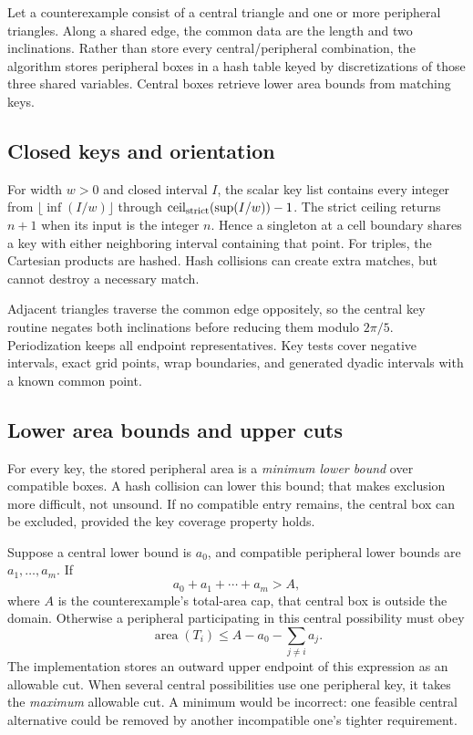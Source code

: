 \documentclass[11pt,a4paper]{article}
\newcommand{\code}[1]{\texttt{\detokenize{#1}}}
\newcommand{\area}{\operatorname{area}}\newcommand{\arc}{\operatorname{arc}}
\theoremstyle{remark}\newtheorem*{contract}{Implementation contract}\newtheorem*{auditnote}{Audit note}
\begin{document}
Let a counterexample consist of a central triangle and one or more peripheral
triangles. Along a shared edge, the common data are the length and two
inclinations. Rather than store every central/peripheral combination, the
algorithm stores peripheral boxes in a hash table keyed by discretizations
of those three shared variables. Central boxes retrieve lower area bounds
from matching keys.

\subsection{Closed keys and orientation}
For width $w>0$ and closed interval $I$, the scalar key list contains every
integer from $\lfloor\inf(I/w)\rfloor$ through
$\operatorname{ceil}_{\rm strict}(\sup(I/w))-1$. The strict ceiling
returns $n+1$ when its input is the integer $n$. Hence a singleton at a cell
boundary shares a key with either neighboring interval containing that point.
For triples, the Cartesian products are hashed. Hash collisions can create
extra matches, but cannot destroy a necessary match.



Adjacent triangles traverse the common edge oppositely, so the central
key routine negates both inclinations before reducing them modulo $2\pi/5$.
Periodization keeps all endpoint representatives. Key tests cover negative
intervals, exact grid points, wrap boundaries, and generated dyadic intervals
with a known common point.

\subsection{Lower area bounds and upper cuts}
For every key, the stored peripheral area is a \emph{minimum lower bound}
over compatible boxes. A hash collision can lower this bound; that makes
exclusion more difficult, not unsound. If no compatible entry remains, the
central box can be excluded, provided the key coverage property holds.

Suppose a central lower bound is $a_0$, and compatible peripheral lower
bounds are $a_1,\ldots,a_m$. If
\[
a_0+a_1+\cdots+a_m>A,
\]
where $A$ is the counterexample's total-area cap, that central box is outside
the domain. Otherwise a peripheral participating in this central possibility
must obey
\[
\area(T_i)\le A-a_0-\sum_{j\ne i}a_j.
\]
The implementation stores an outward upper endpoint of this expression as an
allowable cut. When several central possibilities use one peripheral key,
it takes the \emph{maximum} allowable cut. A minimum would be incorrect:
one feasible central alternative could be removed by another incompatible
one's tighter requirement.
\end{document}
